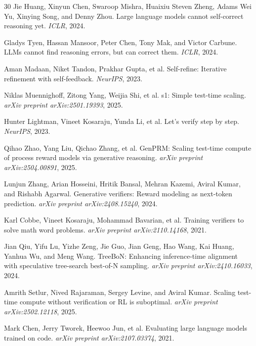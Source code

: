 \documentclass{article}
\begin{document}
\begin{thebibliography}{30}
Jie Huang, Xinyun Chen, Swaroop Mishra, Huaixiu Steven Zheng, Adams Wei Yu, Xinying Song, and Denny Zhou.
\newblock Large language models cannot self-correct reasoning yet.
\newblock \emph{ICLR}, 2024.

Gladys Tyen, Hassan Mansoor, Peter Chen, Tony Mak, and Victor Carbune.
\newblock LLMs cannot find reasoning errors, but can correct them.
\newblock \emph{ICLR}, 2024.

Aman Madaan, Niket Tandon, Prakhar Gupta, et al.
\newblock Self-refine: Iterative refinement with self-feedback.
\newblock \emph{NeurIPS}, 2023.

Niklas Muennighoff, Zitong Yang, Weijia Shi, et al.
\newblock s1: Simple test-time scaling.
\newblock \emph{arXiv preprint arXiv:2501.19393}, 2025.

Hunter Lightman, Vineet Kosaraju, Yunda Li, et al.
\newblock Let's verify step by step.
\newblock \emph{NeurIPS}, 2023.

Qihao Zhao, Yang Liu, Qichao Zhang, et al.
\newblock GenPRM: Scaling test-time compute of process reward models via generative reasoning.
\newblock \emph{arXiv preprint arXiv:2504.00891}, 2025.

Lunjun Zhang, Arian Hosseini, Hritik Bansal, Mehran Kazemi, Aviral Kumar, and Rishabh Agarwal.
\newblock Generative verifiers: Reward modeling as next-token prediction.
\newblock \emph{arXiv preprint arXiv:2408.15240}, 2024.

Karl Cobbe, Vineet Kosaraju, Mohammad Bavarian, et al.
\newblock Training verifiers to solve math word problems.
\newblock \emph{arXiv preprint arXiv:2110.14168}, 2021.

Jian Qiu, Yifu Lu, Yizhe Zeng, Jie Guo, Jian Geng, Hao Wang, Kai Huang, Yanhua Wu, and Meng Wang.
\newblock TreeBoN: Enhancing inference-time alignment with speculative tree-search best-of-N sampling.
\newblock \emph{arXiv preprint arXiv:2410.16033}, 2024.

Amrith Setlur, Nived Rajaraman, Sergey Levine, and Aviral Kumar.
\newblock Scaling test-time compute without verification or RL is suboptimal.
\newblock \emph{arXiv preprint arXiv:2502.12118}, 2025.

Mark Chen, Jerry Tworek, Heewoo Jun, et al.
\newblock Evaluating large language models trained on code.
\newblock \emph{arXiv preprint arXiv:2107.03374}, 2021.


\end{thebibliography}
\end{document}
